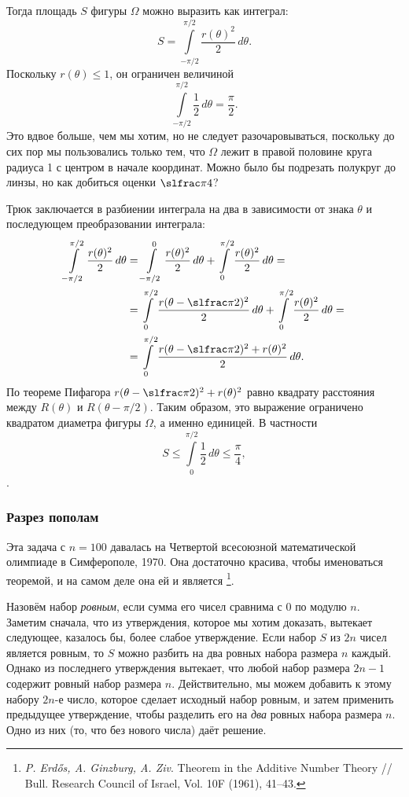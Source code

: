 \documentclass[twoside]{book}
\begin{document}
Тогда площадь $S$ фигуры $\Omega$ можно выразить как интеграл:
\[S=\int\limits_{-\pi/2}^{\pi/2}\frac{r(\theta)^2}{2}\,d\theta.\]
Поскольку $r(\theta) \le 1$, он ограничен величиной
\[\int\limits_{-\pi/2}^{\pi/2}\frac{1}{2}\,d\theta=\frac\pi2.\]
Это вдвое больше, чем мы хотим, но не следует разочаровываться, поскольку до сих пор мы пользовались только тем, что $\Omega$ лежит в правой половине круга радиуса 1 с центром в начале координат.
Можно было бы подрезать полукруг до линзы, но как добиться оценки $\slfrac\pi4$?

Трюк заключается в разбиении интеграла на два в зависимости от знака $\theta$ и последующем преобразовании интеграла:
\begin{align*}
\int\limits_{-\pi/2}^{\pi/2}\frac{r(\theta)^2}{2}\,d\theta&=\int\limits_{-\pi/2}^{0}\frac{r(\theta)^2}{2}\,d\theta+\int\limits_{0}^{\pi/2}\frac{r(\theta)^2}{2}\,d\theta=
\\
&=\int\limits_{0}^{\pi/2}\frac{r(\theta-\slfrac\pi2)^2}{2}\,d\theta+\int\limits_{0}^{\pi/2}\frac{r(\theta)^2}{2}\,d\theta=
\\
&=\int\limits_{0}^{\pi/2}\frac{r(\theta-\slfrac\pi2)^2+r(\theta)^2}{2}\,d\theta.
\end{align*}
По теореме Пифагора $r(\theta-\slfrac\pi2)^2+r(\theta)^2$ равно квадрату расстояния между $R(\theta)$ и $R(\theta- \pi/2)$.
Таким образом, это выражение ограничено квадратом диаметра фигуры $\Omega$, а именно единицей.
В частности
\[S\le \int\limits_{0}^{\pi/2}\frac12\,d\theta\le\frac\pi4,
\]
.
\heart

\subsubsection*{Разрез пополам}

Эта задача с $n=100$ давалась на Четвертой всесоюзной математической олимпиаде в Симферополе, 1970.
Она достаточно красива, чтобы именоваться теоремой, и на самом деле она ей и является%
\footnote{\emph{P. Erd\H{o}s, A. Ginzburg, A. Ziv}. Theorem in the Additive Number Theory /\!/ {Bull. Research Council of Israel}, Vol. 10F (1961), 41--43.}.

\medskip

Назовём набор \emph{ровным}, если сумма его чисел сравнима с $0$ по модулю $n$.
Заметим сначала, что из утверждения, которое мы хотим доказать, вытекает следующее, казалось бы, более слабое утверждение. 
Если набор $S$ из $2n$ чисел является ровным, то $S$ можно разбить на два ровных набора размера $n$ каждый.
Однако из последнего утверждения вытекает, что любой набор размера $2n-1$ содержит ровный набор размера $n$.
Действительно, мы можем добавить к этому набору $2n$-е число, которое сделает исходный набор ровным, и затем применить предыдущее утверждение, чтобы разделить его на \emph{два} ровных набора размера $n$. 
Одно из них (то, что без нового числа) даёт решение.
\end{document}
